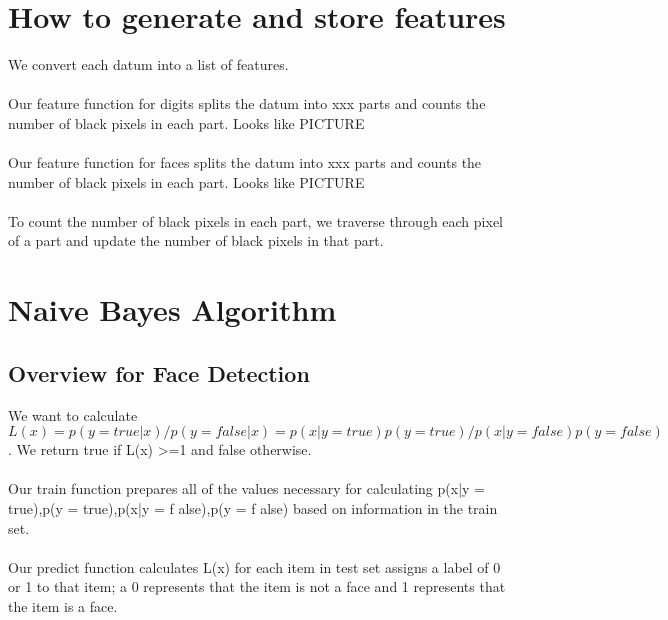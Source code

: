 \documentclass{article}
\begin{document}

\section{How to generate and store features}

We convert each datum into a list of features. \\\\
Our feature function for digits splits the datum into xxx parts and counts the number of black pixels in each part. Looks like PICTURE\\\\
Our feature function for faces splits the datum into xxx parts and counts the number of black pixels in each part. Looks like PICTURE\\\\
To count the number of black pixels in each part, we traverse through each pixel of a part and update the number of black pixels in that part. 


\section{Naive Bayes Algorithm}

\subsection{Overview for Face Detection}

We want to calculate \[ L(x) = p(y = true|x) /p(y = f alse|x) = p(x|y = true)p(y = true) /p(x|y = f alse)p(y = f alse)\]. We return true if L(x) >=1 and false otherwise. \\\\
Our train function prepares all of the values necessary for calculating p(x|y = true),p(y = true),p(x|y = f alse),p(y = f alse) based on information in the train set.\\\\
Our predict function calculates L(x) for each item in test set assigns a label of 0 or 1 to that item; a 0 represents that the item is not a face and 1 represents that the item is a face.
\end{document}
